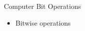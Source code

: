 \begin{withoutheadline}
\begin{frame}{Computer Bit Operations}
\begin{itemize}
    \item Bitwise operations
\end{itemize}
\end{frame}

\end{withoutheadline}
 
